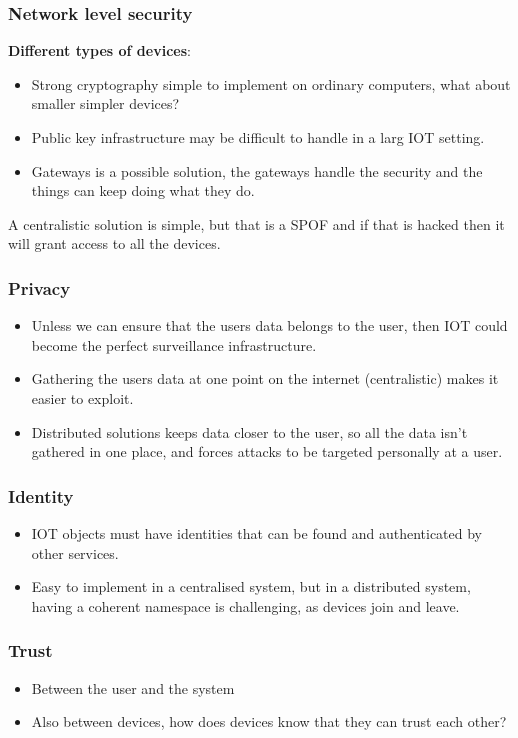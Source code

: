	\subsubsection{Network level security}
	\textbf{Different types of devices}:
	\begin{itemize}
		\item Strong cryptography simple to implement on ordinary computers, what about smaller simpler devices?
		\item Public key infrastructure may be difficult to handle in a larg \gls{IOT} setting.
		\item Gateways is a possible solution, the gateways handle the security and the things can keep doing what they do.
	\end{itemize}
	A centralistic solution is simple, but that is a \gls{SPOF} and if that is hacked then it will grant access to all the devices.
	
	\subsubsection{Privacy}
	\begin{itemize}
		\item Unless we can ensure that the users data belongs to the user, then \gls{IOT} could become the perfect surveillance infrastructure.
		\item Gathering the users data at one point on the internet (centralistic) makes it easier to exploit.
		\item Distributed solutions keeps data closer to the user, so all the data isn't gathered in one place, and forces attacks to be targeted personally at a user.
	\end{itemize}
	
	\subsubsection{Identity}
	\begin{itemize}
		\item \gls{IOT} objects must have identities that can be found and authenticated by other services.
		\item Easy to implement in a centralised system, but in a distributed system, having a coherent namespace is challenging, as devices join and leave.
	\end{itemize}
	
	\subsubsection{Trust}
	\begin{itemize}
		\item Between the user and the system
		\item Also between devices, how does devices know that they can trust each other?
	\end{itemize}
	
